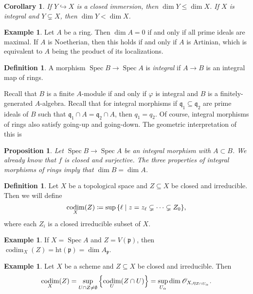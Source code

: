 \documentclass[leqno, openany]{memoir}
\newtheorem{cor}[thm]{Corollary}
\newtheorem{prop}[thm]{Proposition}
\theoremstyle{definition}
\newtheorem{defn}[thm]{Definition}
\newtheorem{exm}[thm]{Example}
\theoremstyle{remark}
\theoremstyle{plain}
\theoremstyle{definition}
\theoremstyle{remark}
\newcommand{\mf}[1]{\mathfrak{#1}}
\newcommand{\mr}[1]{\mathrm{#1}}
\newcommand{\msc}[1]{\mathscr{#1}}
\DeclareMathOperator{\Spec}{Spec}
\DeclareMathOperator{\codim}{codim}
\begin{document}
\begin{cor}
    If $Y \hookrightarrow X$ is a closed immersion, then $\dim Y \leq \dim X$. If $X$ is integral and $Y \subsetneq X$, then $\dim Y < \dim X$.
\end{cor}

\begin{exm}
    Let $A$ be a ring. Then $\dim A = 0$ if and only if all prime ideals are maximal. If $A$ is Noetherian, then this holds if and only if $A$ is Artinian, which is equivalent to $A$ being the product of its localizations.
\end{exm}

\begin{defn}
    A morphism $\Spec B \to \Spec A$ is \textit{integral} if $A \to B$ is an integral map of rings.
\end{defn}

Recall that $B$ is a finite $A$-module if and only if $\varphi$ is integral and $B$ is a finitely-generated $A$-algebra. Recall that for integral morphisms if $\mf{q}_1 \subseteq \mf{q}_2$ are prime ideals of $B$ such that $\mf{q}_1 \cap A = \mf{q}_2 \cap A$, then $q_1 = q_2$. Of course, integral morphisms of rings also satisfy going-up and going-down. The geometric interpretation of this is
\begin{prop}
    Let $\Spec B \to \Spec A$ be an integral morphism with $A \subset B$. We already know that $f$ is closed and surjective. The three properties of integral morphisms of rings imply that $\dim B = \dim A$.
\end{prop}

\begin{defn}
    Let $X$ be a topological space and $Z \subseteq X$ be closed and irreducible. Then we will define
    \[ \codim_X(Z) \coloneqq \sup \qty{\ell \mid z = z_{\ell} \subsetneq \cdots \subsetneq Z_0}, \]
    where each $Z_i$ is a closed irreducible subset of $X$.
\end{defn}

\begin{exm}
    If $X = \Spec A$ and $Z = V(\mf{p})$, then $\codim_X(Z) = \mr{ht}(\mf{p}) = \dim A_{\mf{p}}$.
\end{exm}

\begin{exm}
    Let $X$ be a scheme and $Z \subseteq X$ be closed and irreducible. Then 
    \[ \codim_X(Z) = \sup_{U \cap Z \neq \emptyset} \qty{\codim_U (Z \cap U)} = \sup_{U_{\alpha}} \dim \msc{O}_{X, \eta_{Z \cap U_{\alpha}}}. \]
\end{exm}
\end{document}
